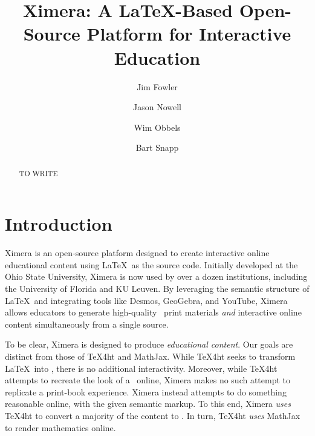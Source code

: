 \documentclass{ltugboat}
\title{Ximera: A \LaTeX{-}Based Open-Source Platform for Interactive
    Education}
\author{Jim Fowler}
\author{Jason Nowell}
\author{Wim Obbels}
\author{Bart Snapp}
\begin{document}
\maketitle

\begin{abstract}
    TO WRITE
\end{abstract}

\section{Introduction}

Ximera is an open-source platform designed to create interactive online
educational
content using \LaTeX\ as the source code. Initially developed at the Ohio State
University, Ximera is now used by over a dozen institutions, including
the University of Florida and KU Leuven. By leveraging the semantic structure
of \LaTeX\ and integrating tools like Desmos, GeoGebra, and YouTube, Ximera
allows educators to generate high-quality \PDF\ print materials \emph{and}
interactive online content simultaneously from a single source.
\begin{center}
\end{center}
To be clear, Ximera is designed to produce \emph{educational content}. Our
goals
are distinct from those of \TeX4ht and MathJax. While \TeX4ht seeks to
transform \LaTeX\ into \HTML, there is no additional interactivity. Moreover,
while \TeX4ht attempts to recreate the look of a \PDF\ online,
Ximera makes no such attempt to replicate a print-book experience. Ximera
instead attempts to do something reasonable
online, with the given semantic markup. To this end,
Ximera \emph{uses} \TeX4ht to convert a majority of the content to \HTML. In
turn,
\TeX4ht \emph{uses} MathJax to render mathematics online.
\end{document}
